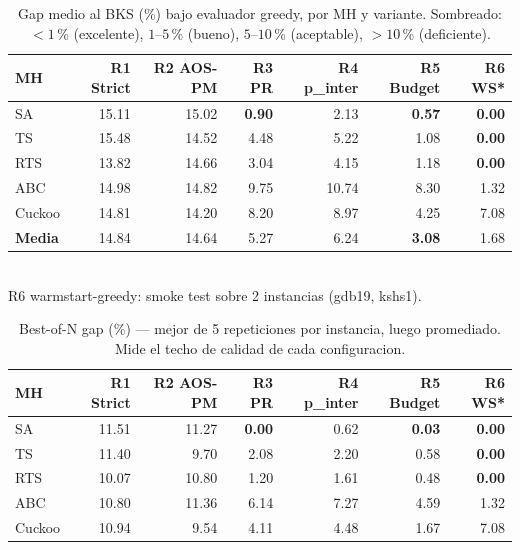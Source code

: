 \begin{table}[h]
\centering
\caption{Gap medio al BKS (\%) bajo evaluador greedy, por MH y variante.
         Sombreado: $< 1$\,\% (excelente), $1$--$5$\,\% (bueno),
         $5$--$10$\,\% (aceptable), $> 10$\,\% (deficiente).}
\label{tab:re-greedy-gap}
\small
\begin{tabular}{lrrrrrr}
\toprule
MH & R1 Strict & R2 AOS-PM & R3 PR & R4 p\_inter & R5 Budget & R6 WS* \\
\midrule
SA      & 15.11 & 15.02 & \textbf{0.90} & 2.13 & \textbf{0.57} & \textbf{0.00} \\
TS      & 15.48 & 14.52 & 4.48          & 5.22 & 1.08          & \textbf{0.00} \\
RTS     & 13.82 & 14.66 & 3.04          & 4.15 & 1.18          & \textbf{0.00} \\
ABC     & 14.98 & 14.82 & 9.75          & 10.74 & 8.30         & 1.32 \\
Cuckoo  & 14.81 & 14.20 & 8.20          & 8.97  & 4.25         & 7.08 \\
\midrule
\textbf{Media} & 14.84 & 14.64 & 5.27 & 6.24 & \textbf{3.08} & 1.68 \\
\bottomrule
\end{tabular}
\\[4pt]
\footnotesize *R6 warmstart-greedy: smoke test sobre 2 instancias (gdb19, kshs1).
\end{table}

\begin{table}[h]
\centering
\caption{Best-of-N gap (\%) — mejor de 5 repeticiones por instancia,
         luego promediado. Mide el techo de calidad de cada configuracion.}
\label{tab:re-greedy-bon}
\small
\begin{tabular}{lrrrrrr}
\toprule
MH & R1 Strict & R2 AOS-PM & R3 PR & R4 p\_inter & R5 Budget & R6 WS* \\
\midrule
SA      & 11.51 & 11.27 & \textbf{0.00} & 0.62 & \textbf{0.03} & \textbf{0.00} \\
TS      & 11.40 &  9.70 & 2.08          & 2.20 & 0.58          & \textbf{0.00} \\
RTS     & 10.07 & 10.80 & 1.20          & 1.61 & 0.48          & \textbf{0.00} \\
ABC     & 10.80 & 11.36 & 6.14          & 7.27 & 4.59          & 1.32 \\
Cuckoo  & 10.94 &  9.54 & 4.11          & 4.48 & 1.67          & 7.08 \\
\bottomrule
\end{tabular}
\end{table}

